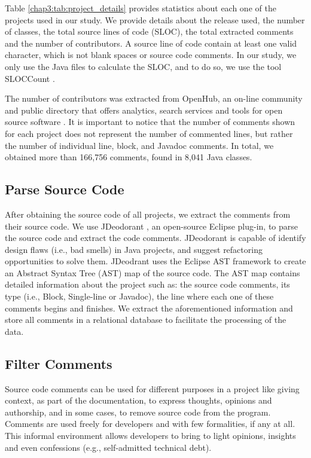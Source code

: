 Table \ref{chap3:tab:project_details} provides statistics about each one of the projects used in our study. We provide details about the release used, the number of classes, the total source lines of code (SLOC), the total extracted comments and the number of contributors. A source line of code contain at least one valid character, which is not blank spaces or source code comments. In our study, we only use the Java files to calculate the SLOC, and to do so, we use the tool SLOCCount \cite{wheeler2004:home}. 

The number of contributors was extracted from OpenHub, an on-line community and public directory that offers analytics, search services and tools for open source software \cite{Openhub:home}. It is important to notice that the number of comments shown for each project does not represent the number of commented lines, but rather the number of individual line, block, and Javadoc comments. In total, we obtained more than 166,756 comments, found in 8,041 Java classes.
 
\subsection{Parse Source Code} 
\label{chap3:sub:parse_source_code}

After obtaining the source code of all projects, we extract the comments from their source code. We use JDeodorant \cite{Tsantalis2008CSMR}, an open-source Eclipse plug-in, to parse the source code and extract the code comments. JDeodorant is capable of identify design flaws (i.e., bad smells) in Java projects, and suggest refactoring opportunities to solve them. JDeodrant uses the Eclipse AST framework to create an Abstract Syntax Tree (AST) map of the source code. The AST map contains detailed information about the project such as: the source code comments, its type (i.e., Block, Single-line or Javadoc), the line where each one of these comments begins and finishes. We extract the aforementioned information and store all comments in a relational database to facilitate the processing of the data.

\subsection{Filter Comments} 
\label{chap3:sub:filter_comments}

Source code comments can be used for different purposes in a project like giving context, as part of the documentation, to express thoughts, opinions and authorship, and in some cases, to remove source code from the program. Comments are used freely for developers and with few formalities, if any at all. This informal environment allows developers to bring to light opinions, insights and even confessions (e.g., self-admitted technical debt). 


